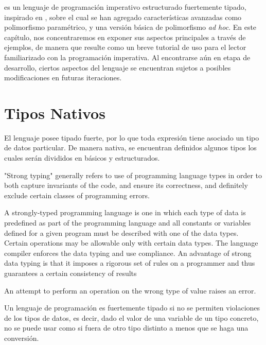 \Lenguaje{} es un lenguaje de programación imperativo estructurado fuertemente tipado, inspirado en \Pascal{}, sobre el cual se han agregado características avanzadas como polimorfismo paramétrico, y una versión básica de polimorfismo \textit{ad hoc}.
En este capítulo, nos concentraremos en exponer sus aspectos principales a través de ejemplos, de manera que resulte como un breve tutorial de uso para el lector familiarizado con la programación imperativa.
Al encontrarse aún en etapa de desarrollo, ciertos aspectos del lenguaje se encuentran sujetos a posibles modificaciones en futuras iteraciones.

\section{Tipos Nativos}

El lenguaje posee tipado fuerte, por lo que toda expresión tiene asociado un tipo de datos particular.
De manera nativa, se encuentran definidos algunos tipos los cuales serán divididos en básicos y estructurados.

\iffalse
"Strong typing" generally refers to use of programming language types in order to both capture invariants of the code, and ensure its correctness, and definitely exclude certain classes of programming errors.

A strongly-typed programming language is one in which each type of data is predefined as part of the programming language and all constants or variables defined for a given program must be described with one of the data types. Certain operations may be allowable only with certain data types. The language compiler enforces the data typing and use compliance. An advantage of strong data typing is that it imposes a rigorous set of rules on a programmer and thus guarantees a certain consistency of results

An attempt to perform an operation on the wrong type of value raises an error.

Un lenguaje de programación es fuertemente tipado si no se permiten violaciones de los tipos de datos, es decir, dado el valor de una variable de un tipo concreto, no se puede usar como si fuera de otro tipo distinto a menos que se haga una conversión.


